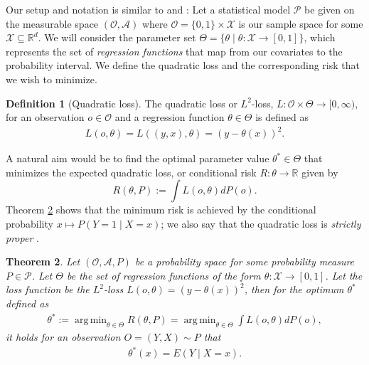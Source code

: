 \documentclass[11pt, a4paper]{article}
\DeclareMathOperator*{\argmin}{arg\,min}
\newtheorem{theorem}{Theorem}
\theoremstyle{definition}
\newtheorem{definition}[theorem]{Definition}
\theoremstyle{remark}
\newcommand{\btheta}{\theta}
\begin{document}
Our setup and notation is similar to \cite{vaart06} and \cite{laan03}:
Let a statistical model $ \mathcal{P} $ be given on the measurable space $ (\mathcal{O}, \mathcal{A}) $ where $ \mathcal{O} = \{0,1\} \times \mathcal{X} $ is our sample space for some $ \mathcal{X} \subseteq \mathbb{R}^{d} $. 
We will consider the parameter set $ \Theta = \{\btheta \mid \btheta : \mathcal{X} \to [0,1]\} $, which represents the set of \textit{regression functions} that map from our covariates to the probability interval. We define the quadratic loss and the corresponding risk that we wish to minimize.
\begin{definition}[Quadratic loss]
    The quadratic loss or $ L^2 $-loss, $ L : \mathcal{O} \times \Theta \to [0, \infty) $, for an observation $ o \in \mathcal{O} $ and a regression function $ \btheta \in \Theta $ is defined as 
\begin{align*}
    L(o, \btheta) = L((y,x), \btheta) = (y - \btheta(x))^2.
\end{align*}
\end{definition}
A natural aim would be to find the optimal parameter value $\btheta^* \in \Theta$ that minimizes the expected quadratic loss, or conditional risk $R: \btheta \to \mathbb{R}$ given by 
\begin{equation} \label{l2risk}
    R(\btheta, P) := \int L(o, \btheta)  dP(o).
\end{equation}
Theorem \ref{minrisk} shows that the minimum risk is achieved by the conditional probability $ x \mapsto P(Y = 1\mid X = x) $; we also say that the quadratic loss is \textit{strictly proper} \parencite{gneiting2007strictly}. 
\begin{theorem} \label{minrisk}
    Let $ (\mathcal{O} , \mathcal{A}, P) $ be a probability space for some probability measure $ P \in \mathcal{P} $. Let $ \Theta $ be the set of regression functions of the form $ \btheta : \mathcal{X} \to [0,1] $. Let the loss function be the $ L^2 $-loss $ L(o, \btheta) = (y - \btheta(x))^2 $, then for the optimum $ \btheta^* $ defined as 
    \begin{align*}
        \btheta^* := \argmin_{\btheta \in \Theta} R(\btheta, P)= \argmin_{\btheta \in \Theta} \int L(o, \btheta)  dP(o),
    \end{align*}
    it holds for an observation $ O = (Y, X) \sim P $ that
    \begin{align*}
        \btheta^{*}(x) = E(Y \mid X = x).
    \end{align*}
\end{theorem}
\end{document}
